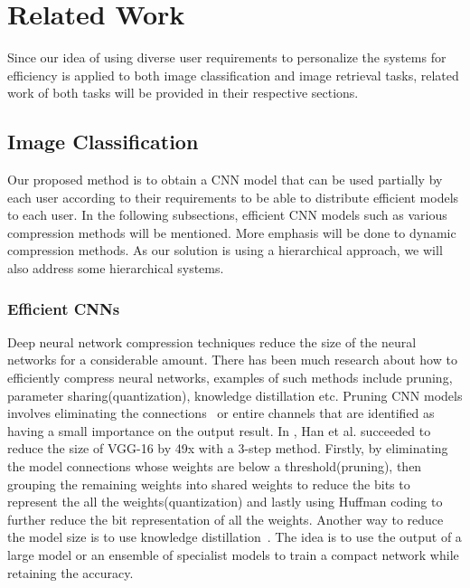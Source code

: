 
\lhead[\chaptername~\thechapter]{\rightmark}

\rhead[\leftmark]{}

\lfoot[\thepage]{}

\cfoot{}

\rfoot[]{\thepage}

\chapter{Related Work}
\label{related}


Since our idea of using diverse user requirements to personalize the systems for efficiency is applied to both image classification and image retrieval tasks, related work of both tasks will be provided in their respective sections.

\section{Image Classification}

Our proposed method is to obtain a CNN model that can be used partially by each user according to their requirements to be able to distribute efficient models to each user.
In the following subsections, efficient CNN models such as various compression methods will be mentioned.
More emphasis will be done to dynamic compression methods.
As our solution is using a hierarchical approach, we will also address some hierarchical systems.

\subsection*{Efficient CNNs}

Deep neural network compression techniques reduce the size of the neural networks for a considerable amount. 
There has been much research about how to efficiently compress neural networks, examples of such methods include pruning, parameter sharing(quantization), knowledge distillation etc. 
Pruning CNN models involves eliminating the connections~\cite{molchanov2016pruning} \cite{Yu_2018_CVPR}\cite{Wang2018StructuredPP} or entire channels \cite{He_2017_ICCV}\cite{li2016pruning} that are identified as having a small importance on the output result. 
In \cite{han2015deep}, Han et al. succeeded to reduce the size of VGG-16 by 49x with a 3-step method. 
Firstly, by eliminating the model connections whose weights are below a threshold(pruning), 
then grouping the remaining weights into shared weights to reduce the bits to represent the all the weights(quantization) and 
lastly using Huffman coding to further reduce the bit representation of all the weights. 
Another way to reduce the model size is to use knowledge distillation~\cite{hinton2015distilling}. 
The idea is to use the output of a large model or an ensemble of specialist models to train a compact network while retaining the accuracy.

